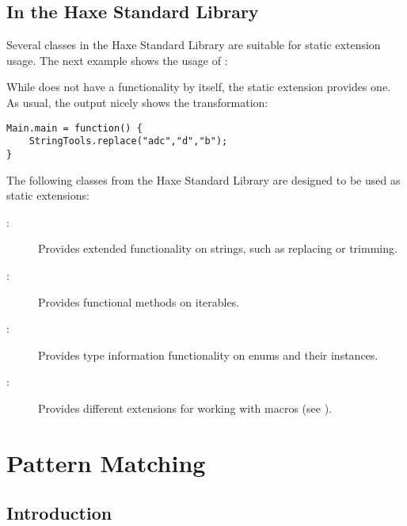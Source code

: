 \subsection{In the Haxe Standard Library}
\label{lf-static-extension-in-std}

Several classes in the Haxe Standard Library are suitable for static extension usage. The next example shows the usage of :


While  does not have a  functionality by itself, the  static extension provides one. As usual, the  output nicely shows the transformation:

\begin{lstlisting}
Main.main = function() {
	StringTools.replace("adc","d","b");
}
\end{lstlisting}

The following classes from the Haxe Standard Library are designed to be used as static extensions:

\begin{description}
	\item[:] Provides extended functionality on strings, such as replacing or trimming.
	\item[:] Provides functional methods on iterables.
	\item[:] Provides type information functionality on enums and their instances.
	\item[:] Provides different extensions for working with macros (see ).
\end{description}






\section{Pattern Matching}
\label{lf-pattern-matching}

\subsection{Introduction}
\label{lf-pattern-matching-introduction}

